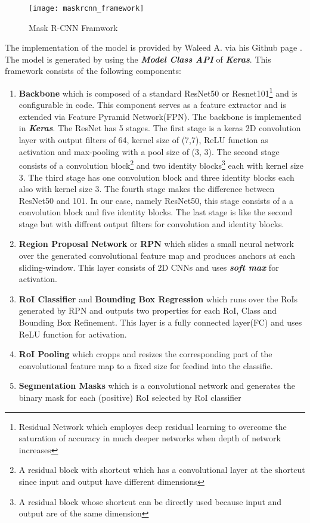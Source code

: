\begin{figure}[h!]
  \centering
  \texttt{[image: maskrcnn\_framework]}
  \caption[Mask R-CNN]
   {Mask R-CNN Framwork \cite{HeGDG17}}
   \label{fig:faster-rcnn}
\end{figure}
\noindent
The implementation of the model is provided by Waleed A. via his Github page \cite{matterport_maskrcnn_2017}. The model is generated by using the\textbf{\textit{ Model Class API}} of \textbf{\textit{Keras}}. This framework consists of the following components:
\newpage
\begin{enumerate}
  \item \textbf{Backbone} which is composed of a standard ResNet50 or Resnet101\footnote{Residual Network which employes deep residual learning to overcome the saturation of accuracy in much deeper networks when depth of  network increases\cite{DBLP}} and is configurable in code. This component serves as a feature extractor and is extended via Feature Pyramid Network(FPN). The backbone is implemented in \textbf{\textit{Keras}}. The ResNet has 5 stages. The first stage is a keras 2D convolution layer with output filters of 64, kernel size of (7,7), ReLU function as activation and max-pooling with a pool size of (3, 3). The second stage consists of a convolution block\footnote{A residual block with shortcut which has a convolutional layer at the shortcut since input and output have different dimensions} and two identity blocks\footnote{A residual block whose shortcut can be directly used because input and output are of the same dimension} each with kernel size 3. The third stage has one convolution block and three identity blocks each also with kernel size 3. The fourth stage makes the difference between ResNet50 and 101. In our case, namely ResNet50, this stage consists of a a convolution block and five identity blocks. The last stage is  like the second stage but with diffrent output filters for convolution and identity blocks.
  \item \textbf{Region Proposal Network} or \textbf{RPN} which slides a small neural network over the generated convolutional feature map and produces anchors at each sliding-window. This layer consists of 2D CNNs and uses \textbf{\textit{soft max}} for activation.  
  \item \textbf{RoI Classifier} and \textbf{Bounding Box Regression} which runs over the RoIs generated by RPN and outputs two properties for each RoI, Class and Bounding Box Refinement. This layer is a fully connected layer(FC) and uses ReLU function for activation. 
  \item \textbf{RoI Pooling} which cropps and resizes the corresponding part of the convolutional feature map to a fixed size for feedind into the classifie.
  \item \textbf{Segmentation Masks} which is a convolutional network and generates the binary mask for each (positive) RoI selected by RoI classifier             
\end{enumerate}

